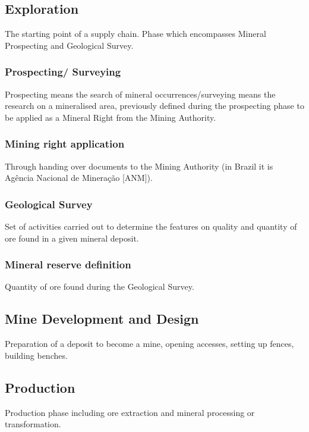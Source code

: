 \subsection{Exploration}\label{sec:Exploration}

The starting point of a supply chain. Phase which encompasses Mineral Prospecting and Geological Survey.

\subsubsection{Prospecting/ Surveying}\label{sec:Prospecting}
Prospecting means the search of mineral occurrences/surveying means the research on a mineralised area, previously defined during the prospecting phase to be applied as a Mineral Right from the Mining Authority.

\subsubsection{Mining right application}\label{sec:Mining}
Through handing over documents to the Mining Authority (in Brazil it is Agência Nacional de Mineração [ANM]).

\subsubsection{Geological Survey}\label{sec:GeologicalSurvey}
Set of activities carried out to determine the features on quality and quantity of ore found in a given mineral deposit.

\subsubsection{Mineral reserve definition}\label{sec:MineralReserve}
Quantity of ore found during the Geological Survey.

\subsection{Mine Development and Design}\label{sec:MineDevelopment}
Preparation of a deposit to become a mine, opening accesses, setting up fences, building benches.


\subsection{Production}\label{sec:Production}
Production phase including ore extraction and mineral processing or transformation.

